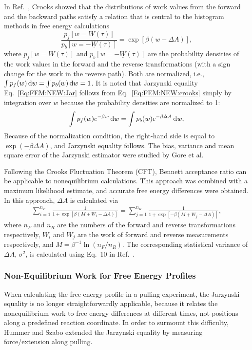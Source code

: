 In Ref.~\cite{CrooksJSP1998}, Crooks showed that the distributions of work values from the forward and the backward paths satisfy a relation that is central to the histogram methods in free energy calculations
\begin{equation}
    \frac{p_{f}[w=W(\tau)]}{p_{b}[w=-\underline{W}(\tau)]}=\exp[\beta(w-\Delta A)],
    \label{Eq:FEM:NEW:crooks}
\end{equation}
where $p_{f}[w=W(\tau)]$ and $p_{b}[w=-\underline{W}(\tau)]$ are the probability densities of the work values in the forward and the reverse transformations (with a sign change for the work in the reverse path). Both are normalized, i.e., $\int p_{f}(w) \mathop{}\!\mathrm{d} w=\int p_{b}(w) \mathop{}\!\mathrm{d} w=1$. It is noted that Jarzynski equality Eq.~\ref{Eq:FEM:NEW:Jar} follows from Eq.~\ref{Eq:FEM:NEW:crooks} simply by integration over $w$ because the probability densities are normalized to 1:
\begin{equation}
    \int p_{f}(w)e^{-\beta w}\mathop{}\!\mathrm{d} w=\int p_{b}(w)e^{-\beta \Delta A}\mathop{}\!\mathrm{d} w,
    \label{Eq:FEM:NEW:crookstojar}
\end{equation}
Because of the normalization condition, the right-hand side is equal to $\exp(-\beta \Delta A)$, and Jarzynski equality follows. The bias, variance and mean square error of the Jarzynski estimator were studied by Gore et al.\cite{GorePNAS2003}

Following the Crooks Fluctuation Theorem (CFT),\cite{CrooksJSP1998} Bennett acceptance ratio can be applicable to nonequilibrium calculations. This approach was combined with a maximum likelihood estimate, and accurate free energy differences were obtained.\cite{ShirtsPRL2003}
In this approach, $\Delta A$ is calculated via
\begin{align}
    \sum_{i=1}^{n_{F}}\frac{1}{1+\exp \left[\beta(M+W_{i}-\Delta A)\right]} = \sum_{j=1}^{n_{R}}\frac{1}{1+\exp \left[-\beta(M+W_{j}-\Delta A)\right]},
    \label{Eq:FEM:NEW:NEBAR}
\end{align}
where $n_{F}$ and $n_{R}$ are the numbers of the forward and reverse transformations respectively, $W_{i}$ and $W_{j}$ are the work of forward and reverse measurements respectively, and $M=\beta^{-1}\ln(n_{F}/n_{R})$.
The corresponding statistical variance of $ \Delta A $, $ \sigma^2 $, is calculated using Eq.~10 in Ref.~\cite{ShirtsPRL2003}.

\subsubsection{Non-Equilibrium Work for Free Energy Profiles\label{Sec:FEM:NEW:FEP}}
When calculating the free energy profile in a pulling experiment, the Jarzynski equality is no longer straightforwardly applicable, because it relates the nonequilibrium work to free energy differences at different times, not positions along a predefined reaction coordinate. In order to surmount this difficulty, Hummer and Szabo extended the Jarzynski equality by measuring force/extension along pulling.\cite{HummerPNAS2001}

